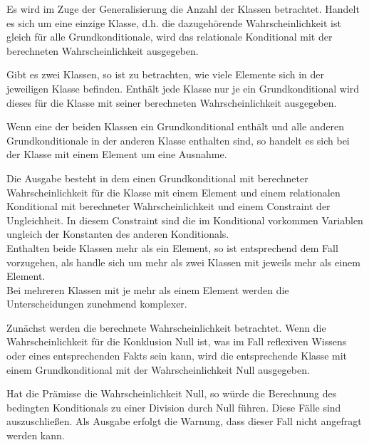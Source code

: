 \documentclass[a4paper, 11pt]{book}
\begin{document}
Es wird im Zuge der Generalisierung   die Anzahl der Klassen betrachtet. Handelt es sich um eine einzige Klasse, d.h. die dazugehörende Wahrscheinlichkeit ist gleich für alle Grundkonditionale, wird das relationale Konditional mit der berechneten Wahrscheinlichkeit ausgegeben.

Gibt es zwei Klassen, so ist zu betrachten, wie viele Elemente sich in der jeweiligen Klasse befinden. Enthält jede Klasse nur je ein Grundkonditional wird dieses für die Klasse mit seiner berechneten Wahrscheinlichkeit ausgegeben.

Wenn eine der beiden Klassen ein Grundkonditional enthält und alle anderen Grundkonditionale in der anderen Klasse enthalten sind, so handelt es sich bei der Klasse mit einem Element um eine Ausnahme.

Die Ausgabe besteht in dem einen Grundkonditional mit berechneter Wahrscheinlichkeit für die Klasse mit einem Element und einem relationalen Konditional mit berechneter Wahrscheinlichkeit und einem Constraint der Ungleichheit. In diesem Constraint sind die im Konditional vorkommen Variablen ungleich der Konstanten des anderen Konditionals.\\  

Enthalten beide Klassen mehr als ein Element, so ist entsprechend dem Fall vorzugehen, als handle sich um mehr als zwei Klassen mit jeweils mehr als einem Element.\\

Bei mehreren Klassen mit je mehr als einem Element werden die Unterscheidungen zunehmend komplexer.

Zunächst werden die berechnete Wahrscheinlichkeit betrachtet. Wenn die Wahrscheinlichkeit für die Konklusion Null ist, was im Fall reflexiven Wissens oder eines entsprechenden Fakts sein kann, wird die entsprechende Klasse mit einem Grundkonditional mit der Wahrscheinlichkeit Null ausgegeben.

Hat die Prämisse die Wahrscheinlichkeit Null, so würde die Berechnung des bedingten Konditionals zu einer Division durch Null führen. Diese Fälle sind auszuschließen. Als Ausgabe erfolgt die Warnung, dass dieser Fall nicht angefragt werden kann.
\end{document}
